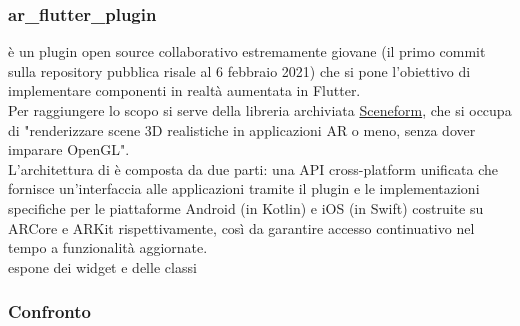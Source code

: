 \subsubsection{ar\_flutter\_plugin}
\aplug{} è un plugin open source collaborativo estremamente giovane (il primo commit sulla repository pubblica risale al 6 febbraio 2021) che si pone l'obiettivo di implementare componenti in realtà aumentata in Flutter.\\
Per raggiungere lo scopo si serve della libreria archiviata \href{https://developers.google.com/sceneform/develop}{Sceneform}, che si occupa di "renderizzare scene 3D realistiche in applicazioni AR o meno, senza dover imparare OpenGL".\\
L'architettura di \aplug{} è composta da due parti: una API cross-platform unificata che fornisce un'interfaccia alle applicazioni tramite il plugin e le implementazioni specifiche per le piattaforme Android (in Kotlin) e iOS (in Swift) costruite su ARCore e ARKit rispettivamente, così da garantire accesso continuativo nel tempo a funzionalità aggiornate.\\
\aplug{} espone dei widget e delle classi 
\todo{}

\subsubsection{Confronto}

